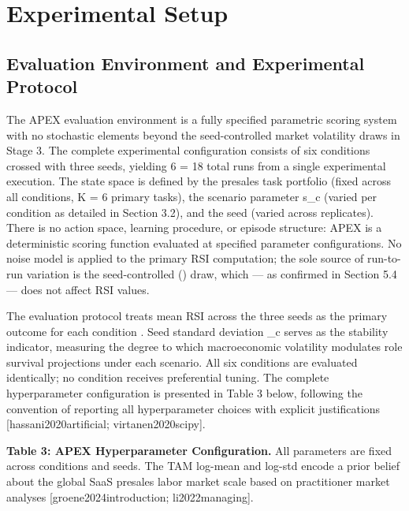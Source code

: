\documentclass[10pt, conference]{IEEEtran}
\begin{document}
{\section{Experimental Setup}

\label{sec:experimental_setup}

\subsection{Evaluation Environment and Experimental Protocol}

\label{sec:evaluation_environment_and_experimental_}

The APEX evaluation environment is a fully specified parametric scoring system with no stochastic elements beyond the seed-controlled market volatility draws in Stage 3. The complete experimental configuration consists of six conditions crossed with three seeds, yielding 6  = 18 total runs from a single experimental execution. The state space is defined by the presales task portfolio  (fixed across all conditions, K = 6 primary tasks), the scenario parameter s\_c (varied per condition as detailed in Section 3.2), and the seed \xi (varied across replicates). There is no action space, learning procedure, or episode structure: APEX is a deterministic scoring function evaluated at specified parameter configurations. No noise model is applied to the primary RSI computation; the sole source of run-to-run variation is the seed-controlled (\xi) draw, which --- as confirmed in Section 5.4 --- does not affect RSI values.

The evaluation protocol treats mean RSI across the three seeds as the primary outcome for each condition \cite{wiser2021expert}. Seed standard deviation \hat{\sigma}\_c serves as the stability indicator, measuring the degree to which macroeconomic volatility modulates role survival projections under each scenario. All six conditions are evaluated identically; no condition receives preferential tuning. The complete hyperparameter configuration is presented in Table 3 below, following the convention of reporting all hyperparameter choices with explicit justifications [hassani2020artificial; virtanen2020scipy].

\textbf{Table 3: APEX Hyperparameter Configuration.} All parameters are fixed across conditions and seeds. The TAM log-mean and log-std encode a prior belief about the global SaaS presales labor market scale based on practitioner market analyses [groene2024introduction; li2022managing].

}
\end{document}
